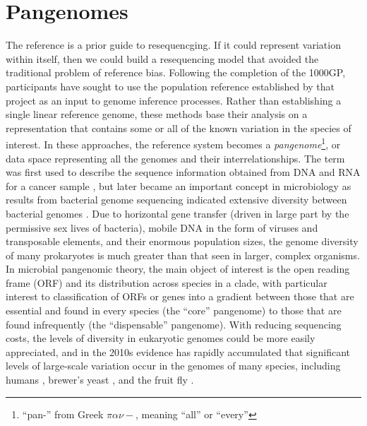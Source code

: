 


\section{Pangenomes}

The reference is a prior guide to resequencging.
If it could represent variation within itself, then we could build a resequencing model that avoided the traditional problem of reference bias.
Following the completion of the 1000GP, participants have sought to use the population reference established by that project as an input to genome inference processes.
Rather than establishing a single linear reference genome, these methods base their analysis on a representation that contains some or all of the known variation in the species of interest.
In these approaches, the reference system becomes a \emph{pangenome}\footnote{``pan-'' from Greek $\pi\alpha\nu-$, meaning ``all'' or ``every''}, or data space representing all the genomes and their interrelationships.
The term was first used to describe the sequence information obtained from DNA and RNA for a cancer sample \cite{sigaux2000cancer}, but later became an important concept in microbiology as results from bacterial genome sequencing indicated extensive diversity between bacterial genomes \cite{tettelin2005genome,medini2005microbial}.
Due to horizontal gene transfer (driven in large part by the permissive sex lives of bacteria), mobile DNA in the form of viruses and transposable elements, and their enormous population sizes, the genome diversity of many prokaryotes is much greater than that seen in larger, complex organisms.
In microbial pangenomic theory, the main object of interest is the open reading frame (ORF) and its distribution across species in a clade\cite{vernikos2015ten}, with particular interest to classification of ORFs or genes into a gradient between those that are essential and found in every species (the ``core'' pangenome) to those that are found infrequently (the ``dispensable'' pangenome).
With reducing sequencing costs, the levels of diversity in eukaryotic genomes could be more easily appreciated, and in the 2010s evidence has rapidly accumulated that significant levels of large-scale variation occur in the genomes of many species, including humans \cite{sudmant2010,sudmant2015integrated,chaisson2018multi}, brewer's yeast \cite{yue2017contrasting}, and the fruit fly \cite{chakraborty2018hidden}.

